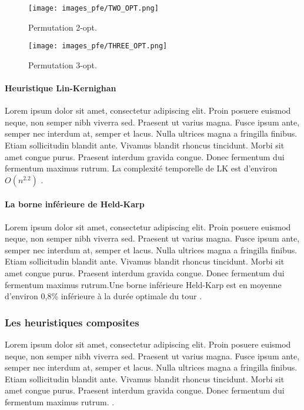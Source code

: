 \begin{figure}[hbt!]
  \centering
  \texttt{[image: images\_pfe/TWO\_OPT.png]}
  \caption{Permutation 2-opt.}
  \label{fig:two-opt}
\end{figure}
\FloatBarrier

\begin{figure}[hbt!]
  \centering
  \texttt{[image: images\_pfe/THREE\_OPT.png]}
  \caption{Permutation 3-opt.}
  \label{fig:three-opt}
\end{figure}
\FloatBarrier


\medskip

\paragraph{Heuristique Lin-Kernighan}
\label{par:lin-kernighan}
Lorem ipsum dolor sit amet, consectetur adipiscing elit. Proin posuere euismod neque, non semper nibh viverra sed. Praesent ut varius magna. Fusce ipsum ante, semper nec interdum at, semper et lacus. Nulla ultrices magna a fringilla finibus. Etiam sollicitudin blandit ante. Vivamus blandit rhoncus tincidunt. Morbi sit amet congue purus. Praesent interdum gravida congue. Donec fermentum dui fermentum maximus rutrum. La complexité temporelle de LK est d'environ $O(n^{2.2})$ \parencite{helsgaun_effective_2000}.

\medskip

\paragraph{La borne inférieure de Held-Karp }
\label{held-karp}
Lorem ipsum dolor sit amet, consectetur adipiscing elit. Proin posuere euismod neque, non semper nibh viverra sed. Praesent ut varius magna. Fusce ipsum ante, semper nec interdum at, semper et lacus. Nulla ultrices magna a fringilla finibus. Etiam sollicitudin blandit ante. Vivamus blandit rhoncus tincidunt. Morbi sit amet congue purus. Praesent interdum gravida congue. Donec fermentum dui fermentum maximus rutrum.Une borne inférieure Held-Karp est en moyenne d'environ 0,8\% inférieure à la durée optimale du tour \parencite{johnson_asymptotic_1996}.

\medskip

\subsubsection{Les heuristiques composites}
Lorem ipsum dolor sit amet, consectetur adipiscing elit. Proin posuere euismod neque, non semper nibh viverra sed. Praesent ut varius magna. Fusce ipsum ante, semper nec interdum at, semper et lacus. Nulla ultrices magna a fringilla finibus. Etiam sollicitudin blandit ante. Vivamus blandit rhoncus tincidunt. Morbi sit amet congue purus. Praesent interdum gravida congue. Donec fermentum dui fermentum maximus rutrum. \parencite{golden_approximate_1980}.

